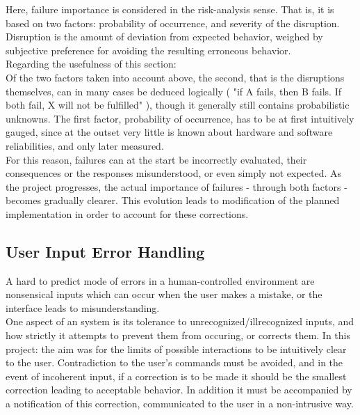 Here, failure importance is considered in the risk-analysis sense. That is, it is based on two factors: probability of occurrence, and severity of the disruption. Disruption is the amount of deviation from expected behavior, weighed by subjective preference for avoiding the resulting erroneous behavior. \\

Regarding the usefulness of this section:\\

Of the two factors taken into account above, the second, that is the disruptions themselves, can in many cases be deduced logically ( "if A fails, then B fails. If both fail, X will not be fulfilled" ), though it generally still contains probabilistic unknowns. The first factor, probability of occurrence, has to be at first intuitively gauged, since at the outset very little is known about hardware and software reliabilities, and only later measured.\\

For this reason, failures can at the start be incorrectly evaluated, their consequences or the responses misunderstood, or even simply not expected. As the project progresses, the actual importance of failures - through both factors - becomes gradually clearer.  This evolution leads to modification of the planned implementation in order to account for these corrections.

\subsection{User Input Error Handling}

A hard to predict mode of errors in a human-controlled environment are nonsensical inputs which can occur when the user makes a mistake, or the interface leads to misunderstanding.\\ 

One aspect of an system is its tolerance to unrecognized/illrecognized inputs, and how strictly it attempts to prevent them from occuring, or corrects them. In this project: the aim was for the limits of possible interactions to be intuitively clear to the user. Contradiction to the user's commands must be avoided, and in the event of incoherent input, if a correction is to be made it should be the smallest correction leading to acceptable behavior. In addition it must be accompanied by a notification of this correction, communicated to the user in a non-intrusive way.\\

